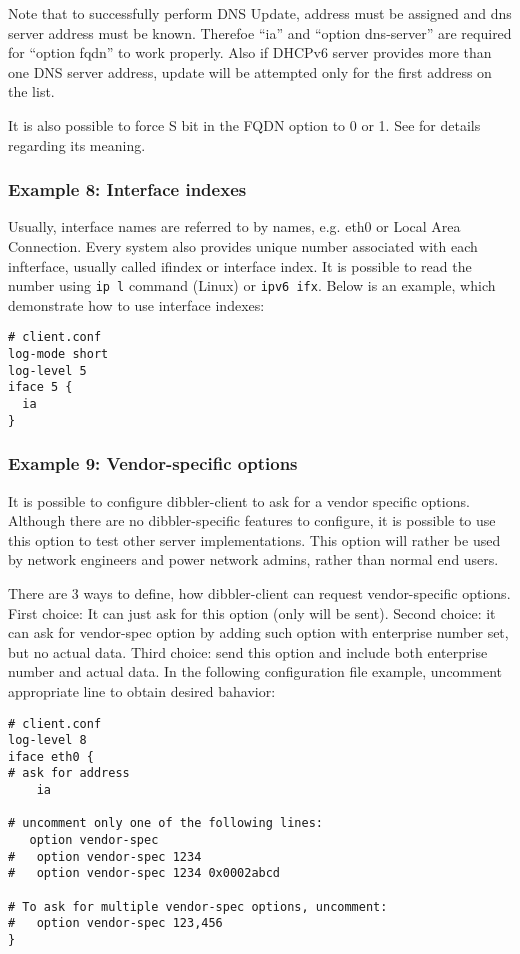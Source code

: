 Note that to successfully perform DNS Update, address must be assigned
and dns server address must be known. Therefoe  ``ia'' and ``option
dns-server'' are required for ``option fqdn'' to work properly. Also if
DHCPv6 server provides more than one DNS server address, update will
be attempted only for the first address on the list.

It is also possible to force S bit in the FQDN option to 0 or 1. See
\cite{rfc4704} for details regarding its meaning.

\subsubsection{Example 8: Interface indexes}
Usually, interface names are referred to by names, e.g. eth0 or Local
Area Connection. Every system also provides unique number associated
with each infterface, usually called ifindex or interface index. It is
possible to read the number using \verb+ip l+ command (Linux) or
\verb+ipv6 ifx+. Below is an example, which demonstrate how to use
interface indexes:

\begin{lstlisting}
# client.conf
log-mode short
log-level 5
iface 5 {
  ia
}
\end{lstlisting}

\subsubsection{Example 9: Vendor-specific options}
\label{example-client-vendor-spec}
It is possible to configure dibbler-client to ask for a vendor specific
options. Although there are no dibbler-specific features to configure,
it is possible to use this option to test other server
implementations. This option will rather be used by network engineers
and power network admins, rather than normal end users.

There are 3 ways to define, how dibbler-client can request
vendor-specific options. First choice: It can just ask for this option (only
 will be sent). Second choice: it can ask for
vendor-spec option by adding such option with enterprise number set, but
no actual data. Third choice: send this option and include both
enterprise number and actual data. In the following configuration file
example, uncomment appropriate line to obtain desired bahavior:

\begin{lstlisting}
# client.conf
log-level 8
iface eth0 {
# ask for address
    ia

# uncomment only one of the following lines:
   option vendor-spec
#   option vendor-spec 1234
#   option vendor-spec 1234 0x0002abcd

# To ask for multiple vendor-spec options, uncomment:
#   option vendor-spec 123,456
}
\end{lstlisting}

